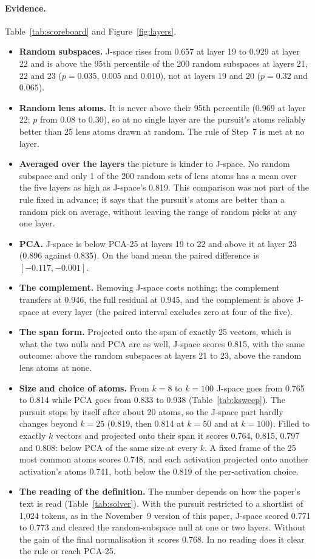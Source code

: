 \documentclass[11pt]{article}
\begin{document}
\paragraph{Evidence.} Table~\ref{tab:scoreboard} and Figure~\ref{fig:layers}.
\begin{itemize}
\item \textbf{Random subspaces.} J-space rises from 0.657 at layer 19 to 0.929 at layer 22 and is above the 95th
percentile of the 200 random subspaces at layers 21, 22 and 23 ($p=0.035$, $0.005$ and $0.010$), not at layers 19 and 20
($p=0.32$ and $0.065$).
\item \textbf{Random lens atoms.} It is never above their 95th percentile (0.969 at layer 22; $p$ from 0.08 to 0.30), so
at no single layer are the pursuit's atoms reliably better than 25 lens atoms drawn at random. The rule of Step~7 is met
at no layer.
\item \textbf{Averaged over the layers} the picture is kinder to J-space. No random subspace and only 1 of the 200 random
sets of lens atoms has a mean over the five layers as high as J-space's 0.819. This comparison was not part of the rule
fixed in advance; it says that the pursuit's atoms are better than a random pick on average, without leaving the range of
random picks at any one layer.
\item \textbf{PCA.} J-space is below PCA-25 at layers 19 to 22 and above it at layer 23 (0.896 against 0.835). On the band
mean the paired difference is $[-0.117, -0.001]$.
\item \textbf{The complement.} Removing J-space costs nothing: the complement transfers at 0.946, the full residual at
0.945, and the complement is above J-space at every layer (the paired interval excludes zero at four of the five).
\item \textbf{The span form.} Projected onto the span of exactly 25 vectors, which is what the two nulls and PCA are as
well, J-space scores 0.815, with the same outcome: above the random subspaces at layers 21 to 23, above the random lens
atoms at none.
\item \textbf{Size and choice of atoms.} From $k=8$ to $k=100$ J-space goes from 0.765 to 0.814 while PCA goes from
0.833 to 0.938 (Table~\ref{tab:ksweep}). The pursuit stops by itself after about 20 atoms, so the J-space part hardly
changes beyond $k=25$ (0.819, then 0.814 at $k=50$ and at $k=100$). Filled to exactly $k$ vectors and projected onto their
span it scores 0.764, 0.815, 0.797 and 0.808: below PCA of the same size at every $k$. A fixed frame of the 25 most common atoms scores 0.748, and each
activation projected onto another activation's atoms 0.741, both below the 0.819 of the per-activation choice.
\item \textbf{The reading of the definition.} The number depends on how the paper's text is read
(Table~\ref{tab:solver}). With the pursuit restricted to a shortlist of 1{,}024 tokens, as in the November~9 version of
this paper, J-space scored 0.771 to 0.773 and cleared the random-subspace null at one or two layers. Without the gain of the final normalisation it scores 0.768. In no
reading does it clear the rule or reach PCA-25.
\end{itemize}
\end{document}
